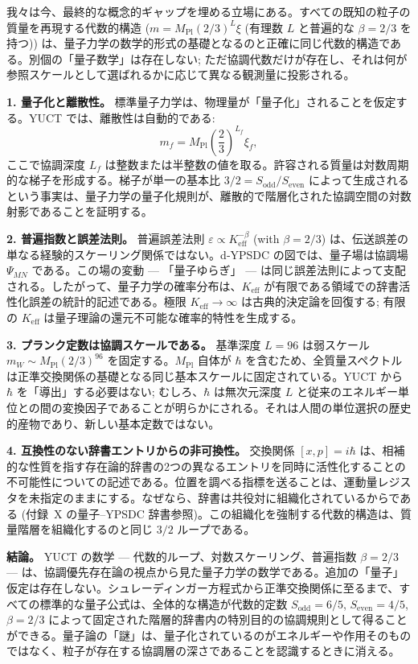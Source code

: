 \documentclass[11pt,a4paper]{article}
\theoremstyle{remark}
\begin{document}
	我々は今、最終的な概念的ギャップを埋める立場にある。すべての既知の粒子の質量を再現する代数的構造 (\(m = M_{\mathrm{Pl}}(2/3)^L\xi\) (有理数 $L$ と普遍的な $\beta=2/3$ を持つ)) は、量子力学の数学的形式の基礎となるのと正確に同じ代数的構造である。別個の「量子数学」は存在しない; ただ協調代数だけが存在し、それは何が参照スケールとして選ばれるかに応じて異なる観測量に投影される。
	
	\medskip
	\noindent\textbf{1. 量子化と離散性。}
	標準量子力学は、物理量が「量子化」されることを仮定する。YUCT では、離散性は自動的である:
	\[
	m_f = M_{\mathrm{Pl}} \left( \frac{2}{3} \right)^{L_f} \xi_f,
	\]
	ここで協調深度 $L_f$ は整数または半整数の値を取る。許容される質量は対数周期的な梯子を形成する。梯子が単一の基本比 $3/2 = S_{\mathrm{odd}}/S_{\mathrm{even}}$ によって生成されるという事実は、量子力学の量子化規則が、離散的で階層化された協調空間の対数射影であることを証明する。
	
	\medskip
	\noindent\textbf{2. 普遍指数と誤差法則。}
	普遍誤差法則 $\varepsilon \propto K_{\mathrm{eff}}^{-\beta}$ (with $\beta = 2/3$) は、伝送誤差の単なる経験的スケーリング関係ではない。d‑YPSDC の図では、量子場は協調場 $\Psi_{MN}$ である。この場の変動 — 「量子ゆらぎ」 — は同じ誤差法則によって支配される。したがって、量子力学の確率分布は、$K_{\mathrm{eff}}$ が有限である領域での辞書活性化誤差の統計的記述である。極限 $K_{\mathrm{eff}}\to\infty$ は古典的決定論を回復する; 有限の $K_{\mathrm{eff}}$ は量子理論の還元不可能な確率的特性を生成する。
	
	\medskip
	\noindent\textbf{3. プランク定数は協調スケールである。}
	基準深度 $L=96$ は弱スケール $m_W \sim M_{\mathrm{Pl}}(2/3)^{96}$ を固定する。$M_{\mathrm{Pl}}$ 自体が $\hbar$ を含むため、全質量スペクトルは正準交換関係の基礎となる同じ基本スケールに固定されている。YUCT から $\hbar$ を「導出」する必要はない; むしろ、$\hbar$ は無次元深度 $L$ と従来のエネルギー単位との間の変換因子であることが明らかにされる。それは人間の単位選択の歴史的産物であり、新しい基本定数ではない。
	
	\medskip
	\noindent\textbf{4. 互換性のない辞書エントリからの非可換性。}
	交換関係 $[x,p]=i\hbar$ は、相補的な性質を指す存在論的辞書の2つの異なるエントリを同時に活性化することの不可能性についての記述である。位置を調べる指標を送ることは、運動量レジスタを未指定のままにする。なぜなら、辞書は共役対に組織化されているからである (付録~X の量子–YPSDC 辞書参照)。この組織化を強制する代数的構造は、質量階層を組織化するのと同じ $3/2$ ループである。
	
	\medskip
	\noindent
	\textbf{結論。} YUCT の数学 — 代数的ループ、対数スケーリング、普遍指数 $\beta=2/3$ — は、協調優先存在論の視点から見た量子力学の数学である。追加の「量子」仮定は存在しない。シュレーディンガー方程式から正準交換関係に至るまで、すべての標準的な量子公式は、全体的な構造が代数的定数 $S_{\mathrm{odd}}=6/5$, $S_{\mathrm{even}}=4/5$, $\beta=2/3$ によって固定された階層的辞書内の特別目的の協調規則として得ることができる。量子論の「謎」は、量子化されているのがエネルギーや作用そのものではなく、粒子が存在する協調層の深さであることを認識するときに消える。
	
\end{document}

